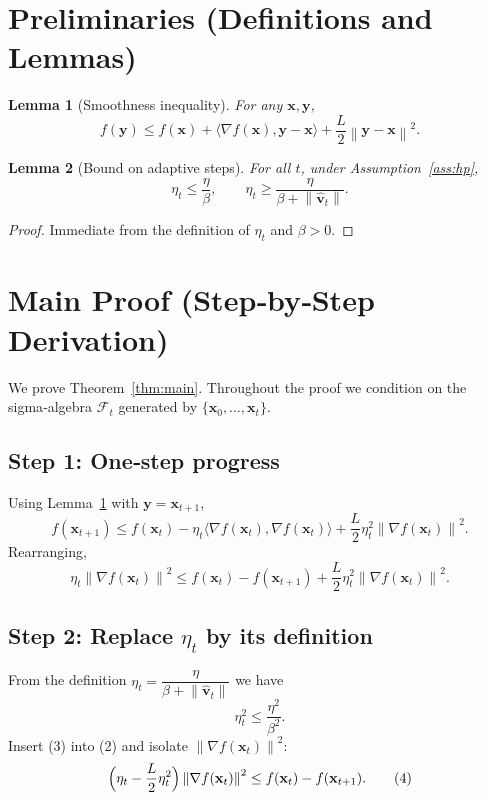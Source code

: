 \documentclass{article}
\newtheorem{lemma}{Lemma}
\newcommand{\norm}[1]{\left\|#1\right\|}
\newcommand{\grad}{\nabla}
\begin{document}
\section*{Preliminaries (Definitions and Lemmas)}
\begin{lemma}[Smoothness inequality]\label{lem:smooth}
For any $\mathbf{x},\mathbf{y}$,
\[
f(\mathbf{y})\le f(\mathbf{x})+\langle\grad f(\mathbf{x}),\mathbf{y}-\mathbf{x}\rangle
+\frac{L}{2}\norm{\mathbf{y}-\mathbf{x}}^{2}.
\]
\end{lemma}
\begin{lemma}[Bound on adaptive steps]\label{lem:step}
For all $t$, under Assumption~\ref{ass:hp},
\[
\eta_t\le \frac{\eta}{\beta},\qquad 
\eta_t\ge \frac{\eta}{\beta+ \norm{\hat{\mathbf{v}}_t}} .
\]
\end{lemma}
\begin{proof}
Immediate from the definition of $\eta_t$ and $\beta>0$.
\end{proof}

\section*{Main Proof (Step‑by‑Step Derivation)}
We prove Theorem~\ref{thm:main}. Throughout the proof we condition on the sigma‑algebra $\mathcal{F}_t$ generated by $\{\mathbf{x}_0,\dots,\mathbf{x}_t\}$.

\subsection*{Step 1: One‑step progress}
Using Lemma~\ref{lem:smooth} with $\mathbf{y}=\mathbf{x}_{t+1}$,
\[
f(\mathbf{x}_{t+1})\le f(\mathbf{x}_t)-\eta_t\langle\grad f(\mathbf{x}_t),\grad f(\mathbf{x}_t)\rangle
+\frac{L}{2}\eta_t^{2}\norm{\grad f(\mathbf{x}_t)}^{2}.
\tag{1}
\]
Rearranging,
\[
\eta_t\norm{\grad f(\mathbf{x}_t)}^{2}
\le f(\mathbf{x}_t)-f(\mathbf{x}_{t+1})
+\frac{L}{2}\eta_t^{2}\norm{\grad f(\mathbf{x}_t)}^{2}.
\tag{2}
\]

\subsection*{Step 2: Replace $\eta_t$ by its definition}
From the definition $\eta_t=\dfrac{\eta}{\beta+\norm{\hat{\mathbf{v}}_t}}$ we have
\[
\eta_t^{2}\le\frac{\eta^{2}}{\beta^{2}} .
\tag{3}
\]
Insert (3) into (2) and isolate $\norm{\grad f(\mathbf{x}_t)}^{2}$:
\[
\Bigl(\eta_t-\frac{L}{2}\eta_t^{2}\Bigr)\norm{\grad f(\mathbf{x}_t)}^{2}
\le f(\mathbf{x}_t)-f(\mathbf{x}_{t+1}).
\tag{4}
\]
\end{document}
